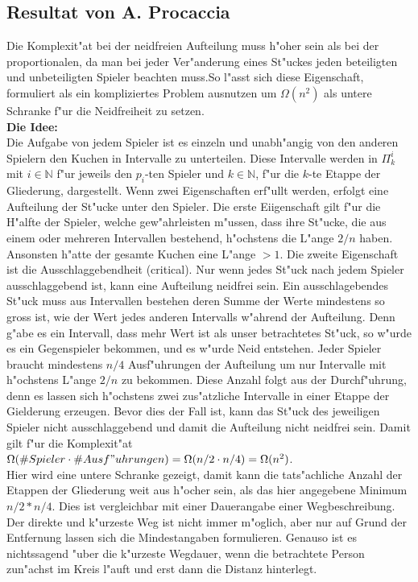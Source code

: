\documentclass[11pt, a4paper, twoside]{article}
\newcommand{\rf}{\color{red}}
\newcommand{\wf}{\color{white}}
\newcommand{\tf}{\color{black}}
\newtheorem{thm}[satz]{Theorem}
\numberwithin{equation}{section}
\begin{document}
\subsection{Resultat von A. Procaccia}
Die Komplexit"at bei der neidfreien Aufteilung muss h"oher sein als bei der proportionalen, da man bei jeder Ver"anderung eines St"uckes jeden beteiligten und unbeteiligten Spieler beachten muss.\rf So l"asst sich diese Eigenschaft, formuliert als ein kompliziertes Problem ausnutzen um $\Omega( n^2)$ als untere Schranke f"ur die Neidfreiheit zu setzen.\tf\\
\newline
\textbf{Die Idee:}\\
Die Aufgabe von jedem Spieler ist es einzeln und unabh"angig von den anderen Spielern den Kuchen in Intervalle zu unterteilen. Diese Intervalle werden in $\Pi_k^i$ mit $i \in \mathbb{N}$ f"ur jeweils den $p_i$-ten Spieler und $k \in \mathbb{N}$, f"ur die $k$-te Etappe der Gliederung, dargestellt. Wenn zwei Eigenschaften erf"ullt werden, erfolgt eine Aufteilung der St"ucke unter den Spieler. Die erste Eiigenschaft gilt f"ur die H"alfte der Spieler, welche gew"ahrleisten m"ussen, dass ihre St"ucke, die aus einem oder mehreren Intervallen bestehend, h"ochstens die L"ange $2/n$ haben. Ansonsten h"atte der gesamte Kuchen eine L"ange $>1$. Die zweite Eigenschaft ist die Ausschlaggebendheit (critical). Nur wenn jedes St"uck nach jedem Spieler ausschlaggebend ist, kann eine Aufteilung neidfrei sein. Ein ausschlagebendes St"uck muss aus Intervallen bestehen deren Summe der Werte mindestens so gross ist, wie der Wert jedes anderen Intervalls w"ahrend der Aufteilung. Denn g"abe es ein Intervall, dass mehr Wert ist als unser betrachtetes St"uck, so w"urde es ein Gegenspieler bekommen, und es w"urde Neid entstehen. Jeder Spieler braucht mindestens $n/4$ Ausf"uhrungen der Aufteilung um nur Intervalle mit h"ochstens L"ange $2/n$ zu bekommen. Diese Anzahl folgt aus der Durchf"uhrung, denn es lassen sich h"ochstens zwei zus"atzliche Intervalle in einer Etappe der Gielderung erzeugen. Bevor dies der Fall ist, kann das St"uck des jeweiligen Spieler nicht ausschlaggebend und damit die Aufteilung nicht neidfrei sein. Damit gilt f"ur die Komplexit"at $\Omega(\# Spieler \cdot \# Ausf"uhrungen)=\Omega(n/2 \cdot n/4)=\Omega(n^2)$.\\ Hier wird eine untere Schranke gezeigt, damit kann die tats"achliche Anzahl der Etappen der Gliederung weit aus h"ocher sein, als das hier angegebene Minimum $n/2*n/4$. Dies ist vergleichbar mit einer Dauerangabe einer Wegbeschreibung. Der direkte und k"urzeste Weg ist nicht immer m"oglich, aber nur auf Grund der Entfernung lassen sich die Mindestangaben formulieren. Genauso ist es nichtssagend "uber die k"urzeste Wegdauer, wenn die betrachtete Person zun"achst im Kreis l"auft  und erst dann die Distanz hinterlegt.\\
\end{document}
